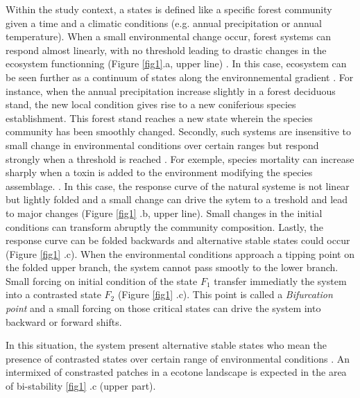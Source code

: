 
Within the study context, a states is defined like a specific forest community
given a time and a climatic conditions (e.g. annual precipitation or annual
temperature). When a small environmental change occur, forest systems can
respond almost linearly, with no threshold leading to drastic changes in the
ecosystem functionning (Figure \ref{fig1}.a, upper line)
\cite{Scheffer2001,Scheffer2009}. In this case, ecosystem can be seen further
as a continuum of states along the environnemental gradient
\cite{Scheffer2001,Scheffer2009,scheffer2009critical}. For instance, when the
annual precipitation increase slightly in a forest deciduous stand, the new
local condition gives rise to a new coniferious species establishment. This
forest stand reaches a new state wherein the species community has been
smoothly changed. Secondly, such systems are insensitive to small change in
environmental conditions over certain ranges but respond strongly when a
threshold is reached \cite{scheffer2009critical}. For exemple, species
mortality can increase sharply when a toxin is added to the environment
modifying the species assemblage. \cite{scheffer2009critical}. In this case,
the response curve of the natural systeme is not linear but lightly folded and
a small change can drive the sytem to a treshold and lead to major changes
(Figure \ref{fig1} .b, upper line). Small changes in the initial conditions
can transform abruptly the community composition. Lastly, the response curve
can be folded backwards and alternative stable states could occur (Figure
\ref{fig1} .c). When the environmental conditions approach a tipping point on
the folded upper branch, the system cannot pass smootly to the lower branch.
Small forcing on initial condition of the state $F_1$ transfer immediatly the
system into a contrasted state $F_2$ (Figure \ref{fig1} .c). This point is
called a \textit{Bifurcation point} and a small forcing on those critical
states can drive the system into backward or forward shifts.


In this situation, the system present alternative stable states who mean the
presence of contrasted states over certain range of environmental conditions
\cite{scheffer2009critical}. An intermixed of constrasted patches in a ecotone
landscape is expected in the area of bi-stability \ref{fig1} .c (upper part).\\


